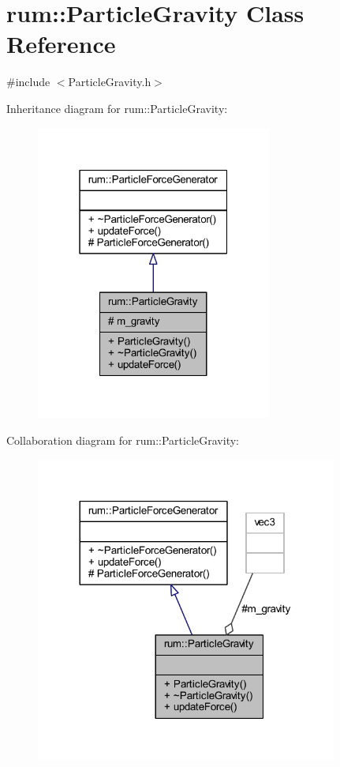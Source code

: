 \hypertarget{classrum_1_1_particle_gravity}{}\section{rum\+:\+:Particle\+Gravity Class Reference}
\label{classrum_1_1_particle_gravity}


{\ttfamily \#include $<$Particle\+Gravity.\+h$>$}



Inheritance diagram for rum\+:\+:Particle\+Gravity\+:\nopagebreak
\begin{figure}[H]
\begin{center}
\leavevmode
\includegraphics[width=220pt]{classrum_1_1_particle_gravity__inherit__graph}
\end{center}
\end{figure}


Collaboration diagram for rum\+:\+:Particle\+Gravity\+:\nopagebreak
\begin{figure}[H]
\begin{center}
\leavevmode
\includegraphics[width=281pt]{classrum_1_1_particle_gravity__coll__graph}
\end{center}
\end{figure}
